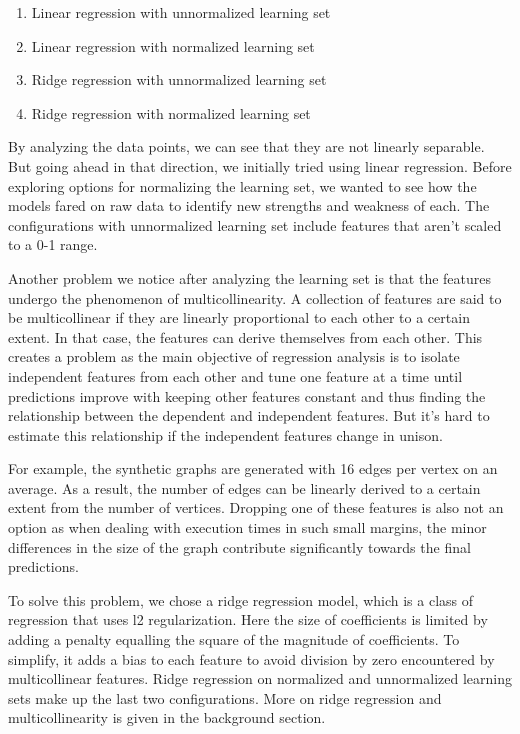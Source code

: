 \begin{enumerate}
    \item Linear regression with unnormalized learning set
    \item Linear regression with normalized learning set
    \item Ridge regression with unnormalized learning set
    \item Ridge regression with normalized learning set
\end{enumerate}
 

By analyzing the data points, we can see that they are not linearly separable. But going ahead in that direction, we initially tried using linear regression. Before exploring options for normalizing the learning set, we wanted to see how the models fared on raw data to identify new strengths and weakness of each. The configurations with unnormalized learning set include features that aren't scaled to a 0-1 range.

Another problem we notice after analyzing the learning set is that the features undergo the phenomenon of multicollinearity. A collection of features are said to be multicollinear if they are linearly proportional to each other to a certain extent. In that case, the features can derive themselves from each other. This creates a problem as the main objective of regression analysis is to isolate independent features from each other and tune one feature at a time until predictions improve with keeping other features constant and thus finding the relationship between the dependent and independent features. But it's hard to estimate this relationship if the independent features change in unison. 


For example, the synthetic graphs are generated with 16 edges per vertex on an average. As a result, the number of edges can be linearly derived to a certain extent from the number of vertices. Dropping one of these features is also not an option as when dealing with execution times in such small margins, the minor differences in the size of the graph contribute significantly towards the final predictions.

To solve this problem, we chose a ridge regression model, which is a class of regression that uses l2 regularization. Here the size of coefficients is limited by adding a penalty equalling the square of the magnitude of coefficients. To simplify, it adds a bias to each feature to avoid division by zero encountered by multicollinear features. Ridge regression on normalized and unnormalized learning sets make up the last two configurations. More on ridge regression and multicollinearity is given in the background section.

